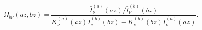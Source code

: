 \begin{equation}
\Omega _{b\nu }(az,bz)=\frac{\bar{I}_{\nu }^{(a)}(az)/\bar{I}_{\nu
}^{(b)}(bz)}{\bar{K}_{\nu }^{(a)}(az)\bar{I}_{\nu }^{(b)}(bz)-\bar{K}_{\nu
}^{(b)}(bz)\bar{I}_{\nu }^{(a)}(az)}.  \label{Omegatilde}
\end{equation}

